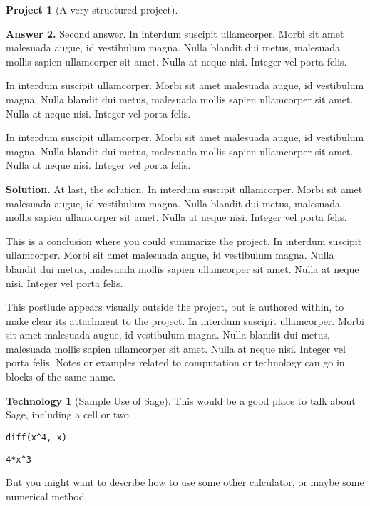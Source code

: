 \documentclass[10pt,]{article}
\theoremstyle{plain}
\theoremstyle{definition}
\theoremstyle{definition}
\theoremstyle{definition}
\newtheorem{technology}[theorem]{Technology}
\theoremstyle{definition}
\newtheorem{project}{Project}[section]
\theoremstyle{definition}
\theoremstyle{definition}
\numberwithin{equation}{section}
\begin{document}
\begin{project}[A very structured project]
\begin{enumerate}[font=\bfseries,label=(\alph*),ref=\alph*]
\noindent\textbf{Answer 2.}\hypertarget{answer-6}{}\quad%
\hypertarget{p-105}{}%
Second answer.  In interdum suscipit ullamcorper. Morbi sit amet malesuada augue, id vestibulum magna. Nulla blandit dui metus, malesuada mollis sapien ullamcorper sit amet. Nulla at neque nisi. Integer vel porta felis.%
\par
\hypertarget{p-106}{}%
In interdum suscipit ullamcorper. Morbi sit amet malesuada augue, id vestibulum magna. Nulla blandit dui metus, malesuada mollis sapien ullamcorper sit amet. Nulla at neque nisi. Integer vel porta felis.%
\par
\hypertarget{p-107}{}%
In interdum suscipit ullamcorper. Morbi sit amet malesuada augue, id vestibulum magna. Nulla blandit dui metus, malesuada mollis sapien ullamcorper sit amet. Nulla at neque nisi. Integer vel porta felis.%
\par\smallskip%
\noindent\textbf{Solution.}\hypertarget{solution-7}{}\quad%
\hypertarget{p-108}{}%
At last, the solution.  In interdum suscipit ullamcorper. Morbi sit amet malesuada augue, id vestibulum magna. Nulla blandit dui metus, malesuada mollis sapien ullamcorper sit amet. Nulla at neque nisi. Integer vel porta felis.%
\end{enumerate}
\bigbreak
\hypertarget{p-109}{}%
This is a conclusion where you could summarize the project.  In interdum suscipit ullamcorper. Morbi sit amet malesuada augue, id vestibulum magna. Nulla blandit dui metus, malesuada mollis sapien ullamcorper sit amet. Nulla at neque nisi. Integer vel porta felis.%
\end{project}
\par
\hypertarget{p-110}{}%
This postlude appears visually outside the project, but is authored within, to make clear its attachment to the project.  In interdum suscipit ullamcorper. Morbi sit amet malesuada augue, id vestibulum magna. Nulla blandit dui metus, malesuada mollis sapien ullamcorper sit amet. Nulla at neque nisi. Integer vel porta felis.%
\hypertarget{p-111}{}%
Notes or examples related to computation or technology can go in blocks of the same name.%
\begin{technology}[Sample Use of Sage]\label{technology-1}
\hypertarget{p-112}{}%
This would be a good place to talk about Sage, including a cell or two.%
\begin{lstlisting}[style=sageinput]
diff(x^4, x)
\end{lstlisting}
\begin{lstlisting}[style=sageoutput]
4*x^3
\end{lstlisting}
\hypertarget{p-113}{}%
But you might want to describe how to use some other calculator, or maybe some numerical method.%
\end{technology}
\typeout{************************************************}
\typeout{************************************************}
\end{document}
